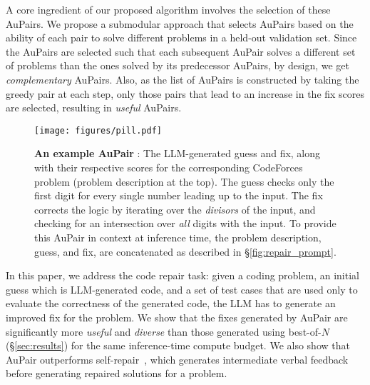 \documentclass[11pt, a4paper, logo, copyright]{googledeepmind}
\def\aupair/{\textcolor{golden}{Au}Pair}
\def\aupairs/{\textcolor{golden}{Au}Pairs}
\newcommand*{\inbigimg}[1]{
    \raisebox{-.2\baselineskip}{
        \texttt{[image: \#1]}
    }
}
\begin{document}
A core ingredient of our proposed algorithm involves the selection of these \aupairs/. We propose a submodular approach that selects \aupairs/ based on the ability of each pair to solve different problems in a held-out validation set. Since the \aupairs/ are selected such that each subsequent \aupair/ solves a different set of problems than the ones solved by its predecessor \aupairs/, by design, we get \emph{complementary} \aupairs/. Also, as the list of \aupairs/ is constructed by taking the greedy pair at each step, only those pairs that lead to an increase in the fix scores are selected, resulting in \emph{useful} \aupairs/.

\begin{figure}[t]
    \texttt{[image: figures/pill.pdf]}
    \caption{\textbf{An example \aupair/} \inbigimg{figures/pair.png}: The LLM-generated guess and fix, along with their respective scores for the corresponding CodeForces problem (problem description at the top). The guess checks only the first digit for every single number leading up to the input. The fix corrects the logic by iterating over the \emph{divisors} of the input, and checking for an intersection over \emph{all} digits with the input. To provide this \aupair/ in context at inference time, the problem description, guess, and fix, are concatenated as described in \S\ref{fig:repair_prompt}.}
    \label{fig:example_aupair}
\end{figure}

In this paper, we address the code repair task: given a coding problem, an initial guess which is LLM-generated code, and a set of test cases that are used only to evaluate the correctness of the generated code, the LLM has to generate an improved fix for the problem. We show that the fixes generated by \aupair/ are significantly more \emph{useful} and \emph{diverse} than those generated using best-of-$N$ (\S\ref{sec:results}) for the same inference-time compute budget. We also show that \aupair/ outperforms self-repair~\citep{olausson2024self}, which generates intermediate verbal feedback before generating repaired solutions for a problem. \\
\end{document}

